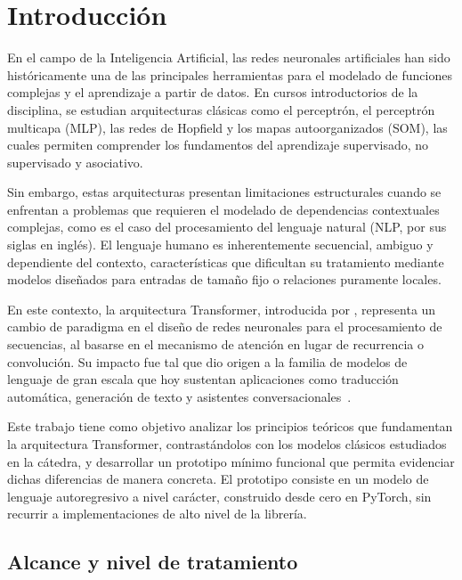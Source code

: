 \section{Introducción}
\label{sec:introduccion}

En el campo de la Inteligencia Artificial, las redes neuronales artificiales
han sido históricamente una de las principales herramientas para el modelado
de funciones complejas y el aprendizaje a partir de datos. En cursos
introductorios de la disciplina, se estudian arquitecturas clásicas como el
perceptrón, el perceptrón multicapa (MLP), las redes de Hopfield y los mapas
autoorganizados (SOM), las cuales permiten comprender los fundamentos del
aprendizaje supervisado, no supervisado y asociativo.

Sin embargo, estas arquitecturas presentan limitaciones estructurales cuando
se enfrentan a problemas que requieren el modelado de dependencias contextuales
complejas, como es el caso del procesamiento del lenguaje natural (NLP, por sus
siglas en inglés). El lenguaje humano es inherentemente secuencial, ambiguo y
dependiente del contexto, características que dificultan su tratamiento mediante
modelos diseñados para entradas de tamaño fijo o relaciones puramente locales.

En este contexto, la arquitectura Transformer, introducida por
\textcite{vaswani2017attention}, representa un cambio de paradigma en el diseño
de redes neuronales para el procesamiento de secuencias, al basarse en el
mecanismo de atención en lugar de recurrencia o convolución. Su impacto fue tal
que dio origen a la familia de modelos de lenguaje de gran escala que hoy
sustentan aplicaciones como traducción automática, generación de texto y
asistentes conversacionales~\cite{rothman2022transformers}.

Este trabajo tiene como objetivo analizar los principios teóricos que
fundamentan la arquitectura Transformer, contrastándolos con los modelos
clásicos estudiados en la cátedra, y desarrollar un prototipo mínimo funcional
que permita evidenciar dichas diferencias de manera concreta. El prototipo
consiste en un modelo de lenguaje autoregresivo a nivel carácter, construido
desde cero en PyTorch, sin recurrir a implementaciones de alto nivel de la
librería.

\subsection*{Alcance y nivel de tratamiento}

